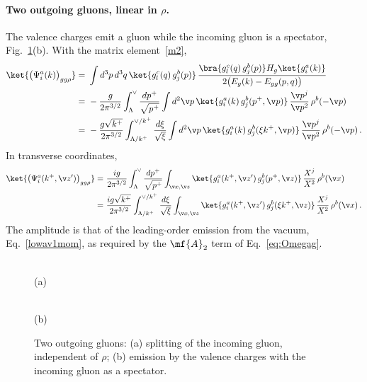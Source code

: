 \paragraph{Two outgoing gluons, linear in $\rho$.}
The valence charges emit a gluon while the incoming gluon is a spectator, Fig.~\ref{fig:twog}(b). With the
matrix element~\eqref{m2},
\begin{align}\label{eq:ggrhoone}
\ket{\big(\Psi^{a}_{i}(k)\big)_{gg\rho}}
=\ &\int d^{3}p\,d^{3}q\,\ket{g^{c}_{l}(q)\,g^{b}_{j}(p)}\,
\frac{\bra{g^{c}_{l}(q)\,g^{b}_{j}(p)}H_{g}\ket{g^{a}_{i}(k)}}{2\big(E_{g}(k)-E_{gg}(p,q)\big)}\notag\\
=\ &-\frac{g}{2\pi^{3/2}}\int_{\Lambda}^{\vee}\frac{dp^{+}}{\sqrt{p^{+}}}\int d^{2}\v p\,
\ket{g^{a}_{i}(k)\,g^{b}_{j}(p^{+},\v p)}\,\frac{\v p^{j}}{\v p^{2}}\,\rho^{b}(-\v p)\notag\\
=\ &-\frac{g\sqrt{k^{+}}}{2\pi^{3/2}}\int_{\Lambda/k^{+}}^{\vee/k^{+}}\frac{d\xi}{\sqrt{\xi}}\int d^{2}\v p\,
\ket{g^{a}_{i}(k)\,g^{b}_{j}(\xi k^{+},\v p)}\,\frac{\v p^{j}}{\v p^{2}}\,\rho^{b}(-\v p)\,.
\end{align}
In transverse coordinates,
\begin{align}\label{eq:ggrhooneX}
\ket{\big(\Psi^{a}_{i}(k^{+},\v z')\big)_{gg\rho}}
=\ &\frac{ig}{2\pi^{3/2}}\int_{\Lambda}^{\vee}\frac{dp^{+}}{\sqrt{p^{+}}}\int_{\v x,\v z}
\ket{g^{a}_{i}(k^{+},\v z')\,g^{b}_{j}(p^{+},\v z)}\,\frac{X^{j}}{X^{2}}\,\rho^{b}(\v x)\notag\\
=\ &\frac{ig\sqrt{k^{+}}}{2\pi^{3/2}}\int_{\Lambda/k^{+}}^{\vee/k^{+}}\frac{d\xi}{\sqrt{\xi}}\int_{\v x,\v z}
\ket{g^{a}_{i}(k^{+},\v z')\,g^{b}_{j}(\xi k^{+},\v z)}\,\frac{X^{j}}{X^{2}}\,\rho^{b}(\v x)\,.
\end{align}
The amplitude is that of the leading-order emission from the vacuum, Eq.~\eqref{lowav1mom}, as required by
the $\mf{A}_{2}$ term of Eq.~\eqref{eq:Omegag}.

\begin{figure}[t]
\centering
\begin{minipage}[b]{0.45\textwidth}\centering{}\\[2pt](a)\end{minipage}\hfill
\begin{minipage}[b]{0.45\textwidth}\centering{}\\[2pt](b)\end{minipage}
\caption{Two outgoing gluons: (a) splitting of the incoming gluon, independent of $\rho$; (b) emission
by the valence charges with the incoming gluon as a spectator.}
\label{fig:twog}
\end{figure}


